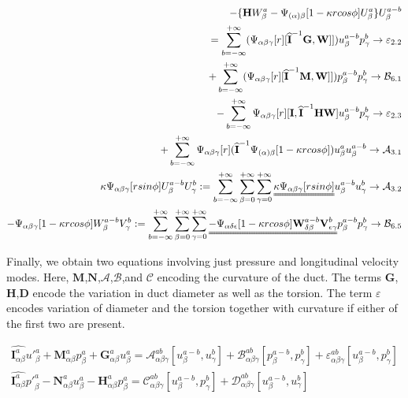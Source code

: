 \documentclass{Note}
\begin{document}
\begin{equation}
\begin{aligned}
-\{\textbf{H}W_\beta^a-\Psi_{(\alpha)\beta}[1-\kappa r cos\phi]U_\beta^a \}U_\beta^{a-b}\\
=\sum_{b=-\infty}^{+\infty}(\Psi_{\alpha\beta\gamma}[r][\widehat{\textbf{I}}^{-1} \textbf{G},\textbf{W}]])u_\beta^{a-b}p_\gamma^{b}\rightarrow \mathcal{\varepsilon}_{2.2}\\
+\sum_{b=-\infty}^{+\infty}(\Psi_{\alpha\beta\gamma}[r][\widehat{\textbf{I}}^{-1} \textbf{M},\textbf{W}]])p_\beta^{a-b}p_\gamma^{b}\rightarrow\mathcal{B}_{6.1}\\
-\sum_{b=-\infty}^{+\infty}\Psi_{\alpha\beta\gamma}[r][\textbf{I},\widehat{\textbf{I}}^{-1}\textbf{HW}]u_\beta^{a-b}p_\gamma^{b}\rightarrow \mathcal{\varepsilon}_{2.3}\\
+\sum_{b=-\infty}^{+\infty}\Psi_{\alpha\beta\gamma}[r]  (\widehat{\textbf{I}}^{-1}\Psi_{(\alpha)\beta}[1-\kappa r cos\phi])u_\beta^a u_\beta^{a-b}  \rightarrow \mathcal{A}_{3.1}\\ 
\kappa \Psi_{\alpha\beta\gamma}[rsin\phi]U_\beta^{a-b}U_\gamma^b:=\sum_{b=-\infty}^{+\infty} \sum_{\beta=0}^{+\infty}\sum_{\gamma=0}^{+\infty}\uuline{\kappa \Psi_{\alpha\beta\gamma}[ r sin\phi]}u_\beta^{a-b}u_\gamma^{b}\rightarrow\mathcal{A}_{3.2}\\
- \Psi_{\alpha\beta\gamma}[1-\kappa r cos\phi]W_\beta^{a-b}V_\gamma^b:=\sum_{b=-\infty}^{+\infty} \sum_{\beta=0}^{+\infty}\sum_{\gamma=0}^{+\infty}\uuline{ -\Psi_{\alpha\delta\epsilon}[1-\kappa r cos\phi]\textbf{W}_{\delta\beta}^{a-b}\textbf{V}_{\epsilon\gamma}^{b}}p_\beta^{a-b}p_\gamma^{b}\rightarrow\mathcal{B}_{6.5}\\
\end{aligned}
\end{equation}


Finally, we obtain two equations involving just pressure and longitudinal velocity modes. Here, $\textbf{M}$,$\textbf{N}$,$\mathcal{A}$,$\mathcal{B}$,and $\mathcal{C}$ encoding the curvature of the duct. The terms $\textbf{G}$,$\textbf{H}$,$\textbf{D}$ encode the variation in duct diameter as well as the torsion. The term $\varepsilon$ encodes variation of diameter and the torsion together with curvature if either of the first two are present.

\begin{equation}
\begin{aligned}
\widehat{\textbf{I}_{\alpha\beta}^a} {u'}_\beta^a+\textbf{M}_{\alpha\beta}^a p_\beta^a + \textbf{G}_{\alpha\beta}^a u_\beta^a=\mathcal{A}_{\alpha\beta\gamma}^{ab}[u_{\beta}^{a-b},u_{\gamma}^{b}]+\mathcal{B}_{\alpha\beta\gamma}^{ab}[p_{\beta}^{a-b},p_{\gamma}^{b}]+\varepsilon_{\alpha\beta\gamma}^{ab}[u_{\beta}^{a-b},p_{\gamma}^{b}]\\
\widehat{\textbf{I}_{\alpha\beta}^a} {p'}_\beta^a-\textbf{N}_{\alpha\beta}^a u_\beta^a-\textbf{H}_{\alpha\beta}^a p_\beta^a=\mathcal{C}_{\alpha\beta\gamma}^{ab}[u_{\beta}^{a-b},p_{\gamma}^{b}]+\mathcal{D}_{\alpha\beta\gamma}^{ab}[u_{\beta}^{a-b},u_{\gamma}^{b}]
\end{aligned}
\end{equation}
\end{document}
